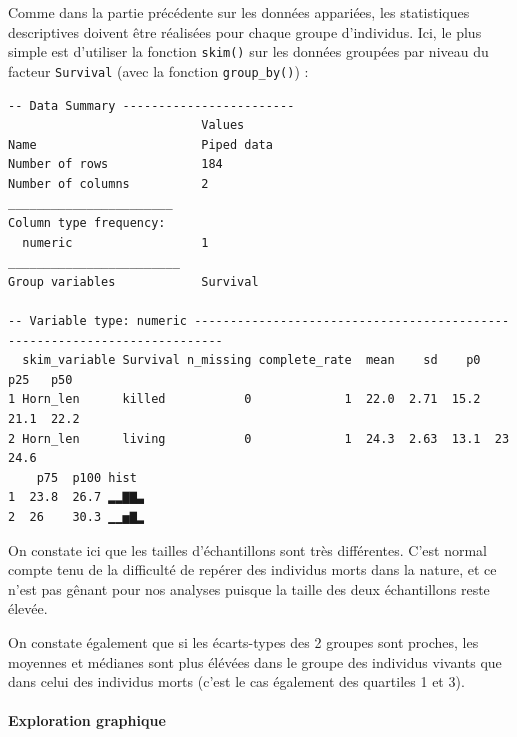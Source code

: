 \documentclass[a4paperpaper,]{article}
\newenvironment{Shaded}{\begin{snugshade}}{\end{snugshade}}
\newcommand{\KeywordTok}[1]{\textcolor[rgb]{0.12,0.11,0.11}{\textbf{#1}}}
\newcommand{\NormalTok}[1]{\textcolor[rgb]{0.12,0.11,0.11}{#1}}
\newcommand{\OperatorTok}[1]{\textcolor[rgb]{0.12,0.11,0.11}{#1}}
\newcommand{\StringTok}[1]{\textcolor[rgb]{0.75,0.01,0.01}{#1}}
\let\oldparagraph\paragraph
\renewcommand{\paragraph}[1]{\oldparagraph{#1}\mbox{}}
\begin{document}
Comme dans la partie précédente sur les données appariées, les statistiques descriptives doivent être réalisées pour chaque groupe d'individus. Ici, le plus simple est d'utiliser la fonction \texttt{skim()} sur les données groupées par niveau du facteur \texttt{Survival} (avec la fonction \texttt{group\_by()}) :

\begin{Shaded}
\end{Shaded}

\begin{verbatim}
-- Data Summary ------------------------
                           Values    
Name                       Piped data
Number of rows             184       
Number of columns          2         
_______________________              
Column type frequency:               
  numeric                  1         
________________________             
Group variables            Survival  

-- Variable type: numeric --------------------------------------------------------------------------
  skim_variable Survival n_missing complete_rate  mean    sd    p0   p25   p50
1 Horn_len      killed           0             1  22.0  2.71  15.2  21.1  22.2
2 Horn_len      living           0             1  24.3  2.63  13.1  23    24.6
    p75  p100 hist 
1  23.8  26.7 ▂▂▇▇▃
2  26    30.3 ▁▁▅▇▂
\end{verbatim}

On constate ici que les tailles d'échantillons sont très différentes. C'est normal compte tenu de la difficulté de repérer des individus morts dans la nature, et ce n'est pas gênant pour nos analyses puisque la taille des deux échantillons reste élevée.

On constate également que si les écarts-types des 2 groupes sont proches, les moyennes et médianes sont plus élévées dans le groupe des individus vivants que dans celui des individus morts (c'est le cas également des quartiles 1 et 3).

\hypertarget{exploration-graphique-2}{%
\paragraph{Exploration graphique}\label{exploration-graphique-2}}
\end{document}
